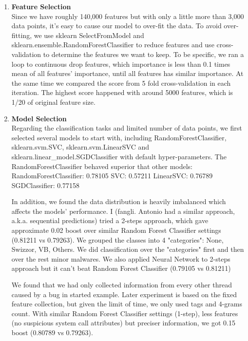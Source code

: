 \documentclass[11pt]{article}
\begin{document}
\begin{enumerate}
\item \textbf{Feature Selection}\\
Since we have roughly 140,000 features but with only a little more than 3,000 data points, it's easy to cause our model to over-fit the data. To avoid over-fitting, we use sklearn SelectFromModel and sklearn.ensemble.RandomForestClassifier to reduce features and use cross-validation to determine the features we want to keep. To be specific, we ran a loop to continuous drop features, which importance is less than 0.1 times mean of all features' importance, until all features has similar importance. At the same time we compared the score from 5 fold cross-validation in each iteration. The highest score happened with around 5000 features, which is 1/20 of original feature size. 
\item\textbf{Model Selection}\\
Regarding the classification tasks and limited number of data points, we first selected several models to start with, including RandomForestClassifier, sklearn.svm.SVC, sklearn.svm.LinearSVC and sklearn.linear\_model.SGDClassifier with default hyper-parameters. The RandomForestClassifier behaved superior that other models:
RandomForestClassifier: 0.78105
SVC: 0.57211
LinearSVC: 0.76789
SGDClassifier: 0.77158

In addition, we found the data distribution is heavily imbalanced which affects the models' performance. I (fangli. Antonio had a similar approach, a.k.a. sequential predictions) tried a 2-steps approach, which gave approximate 0.02 boost over similar Random Forest Classifier settings (0.81211 vs 0.79263). We grouped the classes into 4 "categories": None, Swizzor, VB, Others. We did classification over the "categories" first and then over the rest minor malwares. We also applied Neural Network to 2-steps approach but it can't beat Random Forest Classifier (0.79105 vs 0.81211)

We found that we had only collected information from every other thread caused by a bug in started example. Later experiment is based on the fixed feature collection, but given the limit of time, we only used tags and 4-grams count. With similar Random Forest Classifier settings (1-step), less features (no suspicious system call attributes) but preciser information, we got 0.15 boost (0.80789 vs 0.79263).


\end{enumerate}
\end{document}

